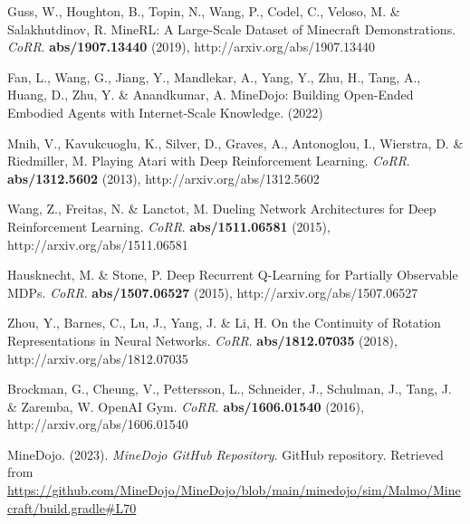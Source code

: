 \documentclass[oneside, under, ko]{snuthesis}
\begin{document}
%

\begin{thebibliography}{00}

    Guss, W., Houghton, B., Topin, N., Wang, P., Codel, C., Veloso, M. \& Salakhutdinov, R. MineRL: A Large-Scale Dataset of Minecraft Demonstrations. {\em CoRR}. \textbf{abs/1907.13440} (2019), http://arxiv.org/abs/1907.13440

    Fan, L., Wang, G., Jiang, Y., Mandlekar, A., Yang, Y., Zhu, H., Tang, A., Huang, D., Zhu, Y. \& Anandkumar, A. MineDojo: Building Open-Ended Embodied Agents with Internet-Scale Knowledge.  (2022)

    Mnih, V., Kavukcuoglu, K., Silver, D., Graves, A., Antonoglou, I., Wierstra, D. \& Riedmiller, M. Playing Atari with Deep Reinforcement Learning. {\em CoRR}. \textbf{abs/1312.5602} (2013), http://arxiv.org/abs/1312.5602

    Wang, Z., Freitas, N. \& Lanctot, M. Dueling Network Architectures for Deep Reinforcement Learning. {\em CoRR}. \textbf{abs/1511.06581} (2015), http://arxiv.org/abs/1511.06581

    Hausknecht, M. \& Stone, P. Deep Recurrent Q-Learning for Partially Observable MDPs. {\em CoRR}. \textbf{abs/1507.06527} (2015), http://arxiv.org/abs/1507.06527

    Zhou, Y., Barnes, C., Lu, J., Yang, J. \& Li, H. On the Continuity of Rotation Representations in Neural Networks. {\em CoRR}. \textbf{abs/1812.07035} (2018), http://arxiv.org/abs/1812.07035

    Brockman, G., Cheung, V., Pettersson, L., Schneider, J., Schulman, J., Tang, J. \& Zaremba, W. OpenAI Gym. {\em CoRR}. \textbf{abs/1606.01540} (2016), http://arxiv.org/abs/1606.01540

    MineDojo. (2023). \textit{MineDojo GitHub Repository}. GitHub repository. Retrieved from \url{https://github.com/MineDojo/MineDojo/blob/main/minedojo/sim/Malmo/Minecraft/build.gradle#L70}


\end{thebibliography}

% 
\end{document}
